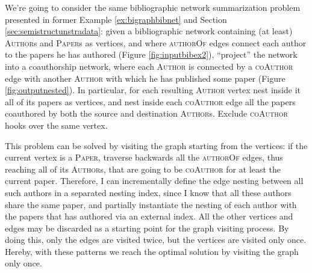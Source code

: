 \begin{example}
	\label{ex:nestingbib}
	We're going to consider the same bibliographic network summarization problem presented in former Example \vref{ex:bigraphbibnet} and Section \vref{sec:semistructunstradata}: given a bibliographic network containing (at least) \textsc{Author}s and \textsc{Paper}s as vertices, and where \textsc{authorOf} edges connect each author to the papers he has authored (Figure \ref{fig:inputbibex2}), ``project'' the network into a coauthorship network, where each \textsc{Author} is connected by a \textsc{coAuthor} edge with another  \textsc{Author} with which he has published some paper (Figure \ref{fig:outputnested}). In particular, for each resulting \textsc{Author} vertex nest inside it all of its papers as vertices, and nest inside each \textsc{coAuthor} edge all the papers coauthored by both the source and destination \textsc{Author}s. Exclude \textsc{coAuthor} hooks over the same vertex.
	
	This problem can be solved by visiting the graph starting from the vertices: if the current vertex is a \textsc{Paper}, traverse backwards all the \textsc{authorOf} edges, thus reaching all of its \textsc{Author}s, that are going to be \textsc{coAuthor} for at least the current paper. Therefore, I can incrementally define the edge nesting between all such authors in a separated nesting index, since I know that all these authors share the same paper, and partially instantiate the nesting of each author with the papers that has authored via an external index. All the other vertices and edges may be discarded as a starting point for the graph visiting process. By doing this, only the edges are visited twice, but the vertices are visited only once. Hereby, with these patterns we reach the optimal solution by visiting the graph only once.
\end{example}


